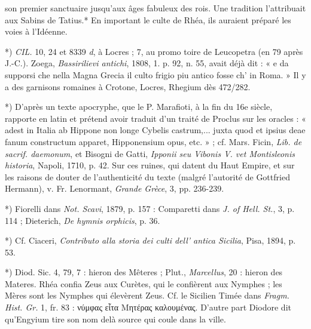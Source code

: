 \documentclass[a4paper, 11pt, oneside, polutonikogreek, french]{article}
\begin{document}
son premier sanctuaire jusqu'aux âges fabuleux des rois. Une tradition l'attribuait aux Sabins de Tatius.* En important le culte de Rhéa, ils auraient préparé les voies à l'Idéenne.

*) \emph{CIL.} 10, 24 et 8339 \emph{d}, à Locres ; 7, au promo toire de Leucopetra (en 79 après J.-C.). Zoega, \emph{Bassirilievi antichi}, 1808, 1. p. 92, n. 55, avait déjà dit : « e da supporsi che nella Magna Grecia il culto frigio piu antico fosse ch' in Roma. » Il y a des garnisons romaines à Crotone, Locres, Rhegium dès 472/282.

*) D'après un texte apocryphe, que le P. Marafioti, à la fin du 16e siècle, rapporte en latin et prétend avoir traduit d'un traité de Proclus sur les oracles : « adest in Italia ab Hippone non longe Cybelis castrum,... juxta quod et ipsius deae fanum constructum apparet, Hipponensium opus, etc. » ; cf. Mars. Ficin, \emph{Lib. de sacrif. daemonum}, et Bisogni de Gatti, \emph{Ipponii seu Vibonis V. vet Montisleonis historia}, Napoli, 1710, p. 42. Sur ces ruines, qui datent du Haut Empire, et sur les raisons de douter de l'authenticité du texte (malgré l'autorité de Gottfried Hermann), v. Fr. Lenormant, \emph{Grande Grèce}, 3, pp. 236-239.

*) Fiorelli dans \emph{Not. Scavi}, 1879, p. 157 : Comparetti dans \emph{J. of Hell. St.}, 3, p. 114 ; Dieterich, \emph{De hymnis orphicis}, p. 36.

*) Cf. Ciaceri, \emph{Contributo alla storia dei culti dell' antica Sicilia}, Pisa, 1894, p. 53.

*) Diod. Sic. 4, 79, 7 : hieron des Mêteres ; Plut., \emph{Marcellus}, 20 : hieron des Materes. Rhéa confia Zeus aux Curètes, qui le confièrent aux Nymphes ; les Mères sont les Nymphes qui élevèrent Zeus. Cf. le Sicilien Timée dans \emph{Fragm. Hist. Gr.} 1, fr. 83 : νύμφας εἶτα Μητέρας καλουμένας. D'autre part Diodore dit qu'Engyium tire son nom delà source qui coule dans la ville.
\end{document}
